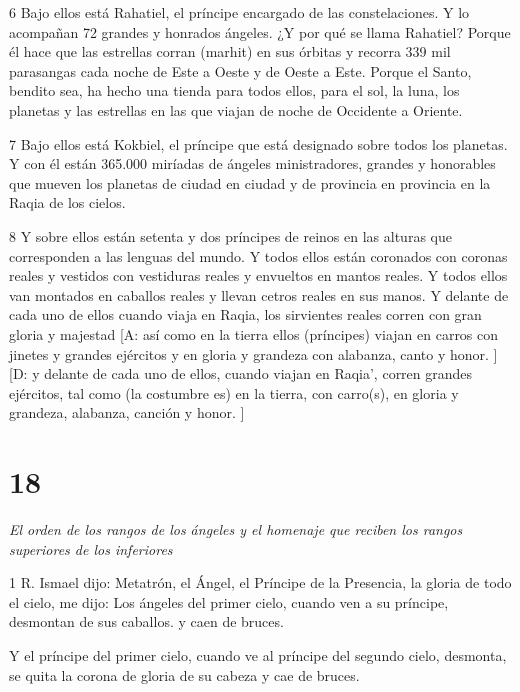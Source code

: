 \par 6 Bajo ellos está Rahatiel, el príncipe encargado de las constelaciones. Y lo acompañan 72 grandes y honrados ángeles. ¿Y por qué se llama Rahatiel? Porque él hace que las estrellas corran (marhit) en sus órbitas y recorra 339 mil parasangas cada noche de Este a Oeste y de Oeste a Este. Porque el Santo, bendito sea, ha hecho una tienda para todos ellos, para el sol, la luna, los planetas y las estrellas en las que viajan de noche de Occidente a Oriente.

\par 7 Bajo ellos está Kokbiel, el príncipe que está designado sobre todos los planetas. Y con él están 365.000 miríadas de ángeles ministradores, grandes y honorables que mueven los planetas de ciudad en ciudad y de provincia en provincia en la Raqia de los cielos.

\par 8 Y sobre ellos están setenta y dos príncipes de reinos en las alturas que corresponden a las lenguas del mundo. Y todos ellos están coronados con coronas reales y vestidos con vestiduras reales y envueltos en mantos reales. Y todos ellos van montados en caballos reales y llevan cetros reales en sus manos. Y delante de cada uno de ellos cuando viaja en Raqia, los sirvientes reales corren con gran gloria y majestad [A: así como en la tierra ellos (príncipes) viajan en carros con jinetes y grandes ejércitos y en gloria y grandeza con alabanza, canto y honor. ] [D: y delante de cada uno de ellos, cuando viajan en Raqia', corren grandes ejércitos, tal como (la costumbre es) en la tierra, con carro(s), en gloria y grandeza, alabanza, canción y honor. ]


\chapter{18}

\par \textit{El orden de los rangos de los ángeles y el homenaje que reciben los rangos superiores de los inferiores}

\par 1 R. Ismael dijo: Metatrón, el Ángel, el Príncipe de la Presencia, la gloria de todo el cielo, me dijo: Los ángeles del primer cielo, cuando ven a su príncipe, desmontan de sus caballos. y caen de bruces.

Y el príncipe del primer cielo, cuando ve al príncipe del segundo cielo, desmonta, se quita la corona de gloria de su cabeza y cae de bruces.

